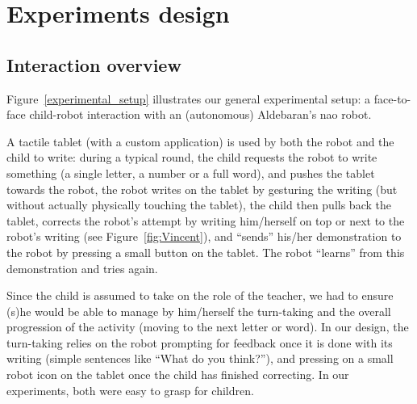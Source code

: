 \documentclass{sig-alternate}
\begin{document}

\section{Experiments design}
\subsection{Interaction overview}
Figure~\ref{experimental_setup} illustrates our general experimental setup: a
face-to-face child-robot interaction with an (autonomous) Aldebaran's {\sc nao}
robot.

A tactile tablet (with a custom application) is used by both the robot and the
child to write: during a typical round, the child requests the robot to write
something (a single letter, a number or a full word), and pushes the tablet
towards the robot, the robot writes on the tablet by gesturing the writing (but
without actually physically touching the tablet), the child then pulls back the
tablet, corrects the robot's attempt by writing him/herself on top or next to
the robot's writing (see Figure~\ref{fig:Vincent}), and ``sends'' his/her
demonstration to the robot by pressing a small button on the tablet. The robot
``learns'' from this demonstration and tries again.

Since the child is assumed to take on the role of the teacher, we had to ensure
(s)he would be able to manage by him/herself the turn-taking and the overall
progression of the activity (moving to the next letter or word). In our design,
the turn-taking relies on the robot prompting for feedback once it is done with
its writing (simple sentences like ``What do you think?''), and pressing on a
small robot icon on the tablet once the child has finished correcting. In our
experiments, both were easy to grasp for children.
\end{document}
